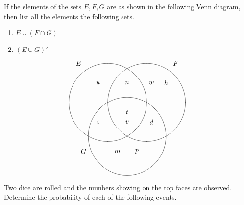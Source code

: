 \documentclass[answers,addpoints,12pt]{exam}
\begin{document}
\begin{questions}

\question[10] If the elements of the sets
$E,F,G$ are as shown in the following Venn diagram, then
list all the elements the following sets.
\begin{enumerate}
\item $E\cup\left(F\cap G\right)$
\item $\left(E\cup G\right)'$
\end{enumerate}
\[\begin{xy}<1cm,0cm>:
(-2.5,2)*{E};
(2.5,2)*{F};
(-2.25,-2.5)*{G};
(-1,0)*\cir<2cm>{};
(1,0)*\cir<2cm>{};
(0,-1.732)*\cir<2cm>{};
(-1.5,1)*{u};
(-1.5,-1)*{i};
(0,1)*{n};
(0,-.5)*{t};
(0,-1)*{v};
(1.25,1)*{w};
(1.25,-1)*{d};
(2,1)*{h};
(-.5,-2.5)*{m};
(.5,-2.5)*{p};
\end{xy}\]

\question[16] Two dice are rolled and the
numbers showing on the top faces are observed.
Determine the probability of each of the following events.
\begin{solution}
\end{solution}
\end{questions}
\end{document}
